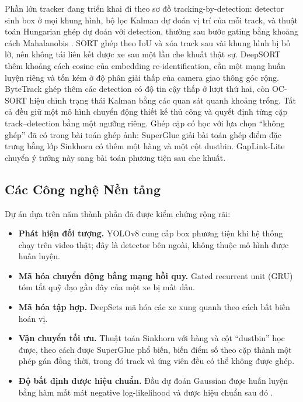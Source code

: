 Phần lớn tracker đang triển khai đi theo sơ đồ tracking-by-detection: detector sinh box ở mọi khung hình, bộ lọc Kalman \cite{kalman1960} dự đoán vị trí của mỗi track, và thuật toán Hungarian \cite{kuhn1955hungarian} ghép dự đoán với detection, thường sau bước gating bằng khoảng cách Mahalanobis \cite{mahalanobis1936}. SORT \cite{bewley2016sort} ghép theo IoU và xóa track sau vài khung hình bị bỏ lỡ, nên không tái liên kết được xe sau một lần che khuất thật sự. DeepSORT \cite{wojke2017deepsort} thêm khoảng cách cosine của embedding re-identification, cần một mạng huấn luyện riêng và tốn kém ở độ phân giải thấp của camera giao thông góc rộng. ByteTrack \cite{zhang2022bytetrack} ghép thêm các detection có độ tin cậy thấp ở lượt thứ hai, còn OC-SORT \cite{cao2023ocsort} hiệu chỉnh trạng thái Kalman bằng các quan sát quanh khoảng trống. Tất cả đều giữ một mô hình chuyển động thiết kế thủ công và quyết định từng cặp track--detection bằng một ngưỡng riêng. Ghép cặp có học với lựa chọn ``không ghép'' đã có trong bài toán ghép ảnh: SuperGlue \cite{sarlin2020superglue} giải bài toán ghép điểm đặc trưng bằng lớp Sinkhorn có thêm một hàng và một cột dustbin. GapLink-Lite chuyển ý tưởng này sang bài toán phương tiện sau che khuất.

\subsection{Các Công nghệ Nền tảng}
\label{sec:bg_tech}

Dự án dựa trên năm thành phần đã được kiểm chứng rộng rãi:
\begin{itemize}
    \item \textbf{Phát hiện đối tượng.} YOLOv8 \cite{jocher2023yolov8} cung cấp box phương tiện khi hệ thống chạy trên video thật; đây là detector bên ngoài, không thuộc mô hình được huấn luyện.
    \item \textbf{Mã hóa chuyển động bằng mạng hồi quy.} Gated recurrent unit (GRU) \cite{cho2014gru} tóm tắt quỹ đạo gần đây của một xe bị mất dấu.
    \item \textbf{Mã hóa tập hợp.} DeepSets \cite{zaheer2017deepsets} mã hóa các xe xung quanh theo cách bất biến hoán vị.
    \item \textbf{Vận chuyển tối ưu.} Thuật toán Sinkhorn \cite{sinkhorn1967,cuturi2013sinkhorn} với hàng và cột ``dustbin'' học được, theo cách được SuperGlue \cite{sarlin2020superglue} phổ biến, biến điểm số theo cặp thành một phép gán đồng thời, trong đó track và ứng viên đều có thể không được ghép.
    \item \textbf{Độ bất định được hiệu chuẩn.} Đầu dự đoán Gaussian được huấn luyện bằng hàm mất mát negative log-likelihood và được hiệu chuẩn sau đó \cite{guo2017calibration}.
\end{itemize}

